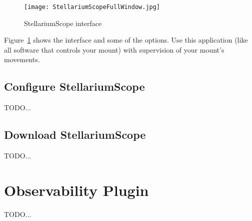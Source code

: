 \begin{figure}[h]
\begin{center}
\texttt{[image: StellariumScopeFullWindow.jpg]}
\end{center}
\label{fig:StellariumScopeFullWindow}
\caption{StellariumScope interface}
\end{figure}

Figure~\ref{fig:StellariumScopeFullWindow} shows the interface and
some of the options.  Use this application (like all software that
controls your mount) with supervision of your mount's movements.

\subsection{Configure StellariumScope}
\label{sec:plugins:StellariumScope:configure}
TODO...
\subsection{Download StellariumScope}
TODO...


\section{Observability Plugin}
\label{sec:plugins.Observability}

TODO...



